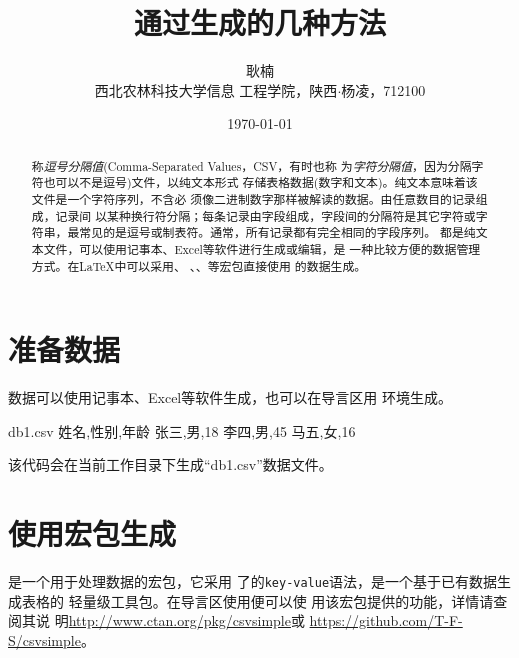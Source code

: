 \documentclass[scheme=chinese, heading = true, UTF8]{ctexart}
\title{\Large \heiti 通过\csv 生成\ltab 的几种方法}
\author{\zihao{4} \fangsong 耿楠\\\small \songti 西北农林科技大学信息
  工程学院，陕西$\cdot$杨凌，712100}
\date{\today}
\begin{document}
  \maketitle

  \begin{abstract}
    \csv 称\emph{逗号分隔值}(Comma-Separated Values，CSV，有时也称
    为\emph{字符分隔值}，因为分隔字符也可以不是逗号)文件，以纯文本形式
    存储表格数据(数字和文本)。纯文本意味着该文件是一个字符序列，不含必
    须像二进制数字那样被解读的数据。\csv 由任意数目的记录组成，记录间
    以某种换行符分隔；每条记录由字段组成，字段间的分隔符是其它字符或字
    符串，最常见的是逗号或制表符。通常，所有记录都有完全相同的字段序列。
    \csv 都是纯文本文件，可以使用记事本、Excel等软件进行生成或编辑，是
    一种比较方便的数据管理方式。在\LaTeX 中可以采用、
    、、等宏包直接使用
    \csv 的数据生成\ltab 。
  \end{abstract}

  \section{准备\csv  数据}
  \csv 数据可以使用记事本、Excel等软件生成，也可以在导言区用
  环境生成。
  \begin{center}
    \begin{minipage}[h]{0.6\linewidth}
      \begin{codeonly}
        \begin{filecontents*}{db1.csv}
          姓名,性别,年龄
          张三,男,18
          李四,男,45
          马五,女,16
        \end{filecontents*}
      \end{codeonly}
    \end{minipage}
  \end{center}
    
  该代码会在当前工作目录下生成``db1.csv''数据文件。

  \section{使用宏包生成\ltab }
  是一个用于处理\csv 数据的宏包，它采用
  了的\texttt{key-value}语法，是一个基于已有数据生成表格的
  轻量级工具包。在导言区使用\qtmark{\texinline{\usepackage{csvsimple}}}便可以使
  用该宏包提供的功能，详情请查阅其说
  明\url{http://www.ctan.org/pkg/csvsimple}或
  \url{https://github.com/T-F-S/csvsimple}。
\end{document}
